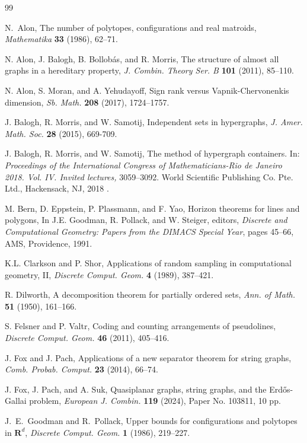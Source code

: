 \documentclass[11pt]{article}
\theoremstyle{plain}
\theoremstyle{definition}
\theoremstyle{remark}
\begin{document}
\begin{thebibliography}{99}

 N.~Alon, The number of polytopes, configurations and real matroids, \emph{Mathematika} \textbf{33} (1986), 62--71.

 N. Alon, J. Balogh, B. Bollob\'as, and R. Morris, The structure of almost all graphs in a hereditary property, \emph{J. Combin. Theory Ser. B} \textbf{101} (2011), 85--110.


 N. Alon, S. Moran, and A. Yehudayoff, Sign rank versus Vapnik-Chervonenkis dimension, \emph{Sb. Math.} \textbf{208} (2017), 1724--1757. 

 J. Balogh, R. Morris, and W. Samotij, Independent sets in hypergraphs, 
\emph{J. Amer. Math. Soc.} \textbf{28} (2015), 669-709.

 J. Balogh, R. Morris, and W. Samotij, 
The method of hypergraph containers. In: \emph{Proceedings of the International Congress of Mathematicians-Rio de Janeiro 2018. Vol. IV. Invited lectures,} 3059--3092.
World Scientific Publishing Co. Pte. Ltd., Hackensack, NJ, 2018
.

 M. Bern, D. Eppstein, P. Plassmann, and F. Yao, Horizon theorems for lines and
polygons, In J.E. Goodman, R. Pollack, and W. Steiger, editors, \emph{Discrete and Computational Geometry: Papers from the DIMACS Special Year}, pages 45--66, AMS,
Providence, 1991.

 K.L. Clarkson and P. Shor, Applications of random sampling in computational geometry, II, \emph{Discrete Comput. Geom.} \textbf{4} (1989), 387--421.

  R. Dilworth, A decomposition theorem for partially ordered sets, \emph{Ann. of Math.} \textbf{51} (1950),
161--166.

 S. Felsner and P. Valtr, Coding and counting arrangements of pseudolines, \emph{Discrete Comput. Geom.} \textbf{46} (2011), 405--416.

 J. Fox and J. Pach, Applications of a new separator theorem for string graphs, \emph{Comb. Probab. Comput.} \textbf{23} (2014), 66--74.

 J. Fox, J. Pach, and A. Suk, Quasiplanar graphs, string graphs, and the Erd\H{o}s-Gallai problem, \emph{European J. Combin.} {\bf 119} (2024), Paper No. 103811, 10 pp.

 J.~E.~Goodman and R.~Pollack, Upper bounds for configurations and polytopes in $\textbf{R}^d$, \emph{Discrete Comput. Geom.} \textbf{1} (1986), 219--227.


\end{thebibliography}
\end{document}
